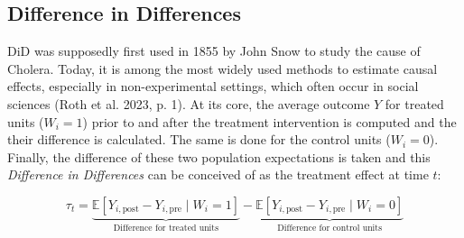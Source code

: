\documentclass[8pt]{article}
\begin{document}
\subsection{Difference in Differences}
DiD was supposedly first used in 1855 by John Snow to study the cause of Cholera. Today, it is among the most widely used methods to estimate causal effects, especially in non-experimental settings, which often occur in social sciences (Roth et al. 2023, p. 1).
At its core, the average outcome $Y$ for treated units ($W_i = 1$) prior to and after the treatment intervention is computed and the their difference is calculated. The same is done for the control units ($W_i = 0$). Finally, the difference of these two population expectations is taken and this \textit{Difference in Differences} can be conceived of as the treatment effect at time $t$: 

\begin{equation}
\tau_t = \underbrace{\mathbb{E}[Y_{i,\text{post}} - Y_{i,\text{pre}} \mid W_i = 1]}_{\text{Difference for treated units}} - \underbrace{\mathbb{E}[Y_{i,\text{post}} - Y_{i,\text{pre}} \mid W_i = 0]}_{\text{Difference for control units}}
\end{equation}
\end{document}
